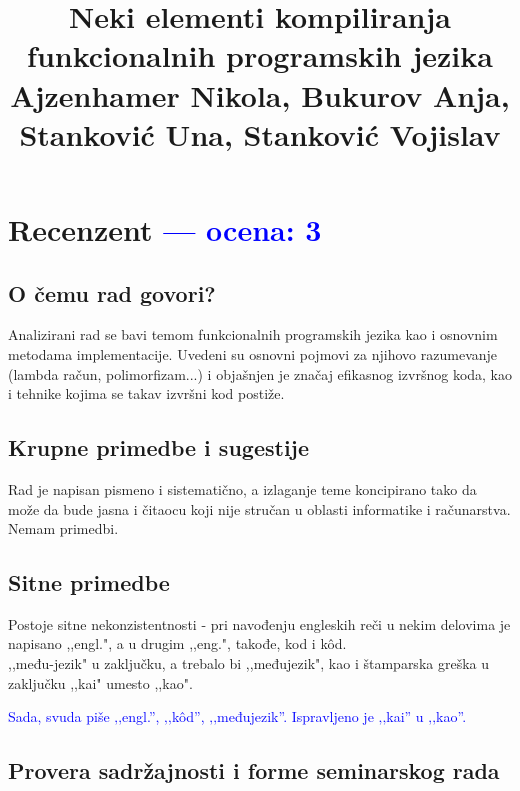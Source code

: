 \documentclass[a4paper]{report}
\newcommand{\odgovor}[1]{\textcolor{blue}{#1}}
\begin{document}
\title{Neki elementi kompiliranja funkcionalnih programskih jezika\\ \small{Ajzenhamer Nikola, Bukurov Anja, Stanković Una, Stanković Vojislav}}

\maketitle

\tableofcontents
 
\chapter{Recenzent \odgovor{--- ocena: 3} }

\section{O čemu rad govori?}
Analizirani rad se bavi temom funkcionalnih programskih jezika kao i osnovnim metodama implementacije. Uvedeni su osnovni pojmovi za njihovo razumevanje (lambda račun, polimorfizam...) i objašnjen je značaj efikasnog izvršnog koda, kao i tehnike kojima se takav izvršni kod postiže.

\section{Krupne primedbe i sugestije}
Rad je napisan pismeno i sistematično, a izlaganje teme koncipirano tako da može da bude jasna i čitaocu koji nije stručan u oblasti informatike i računarstva. Nemam primedbi.

\section{Sitne primedbe}
Postoje sitne nekonzistentnosti - pri navođenju engleskih reči u nekim delovima je napisano ,,engl.", a u drugim ,,eng.", takođe, kod i k\^{o}d. \\ ,,među-jezik" u zaključku, a trebalo bi ,,međujezik", kao i štamparska greška u zaključku ,,kai" umesto ,,kao".

\odgovor{Sada, svuda piše ‚‚engl.'', ‚‚k\^od'', ‚‚međujezik''. Ispravljeno je ‚‚kai'' u ‚‚kao''.}


\section{Provera sadržajnosti i forme seminarskog rada}
\end{document}
